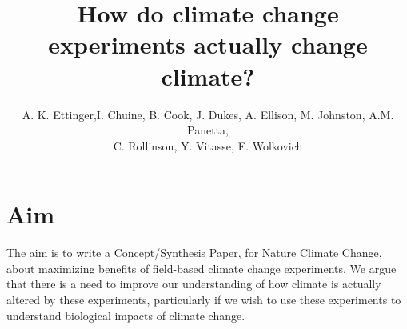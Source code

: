 \documentclass{article}
\begin{document}
 
\title{How do climate change experiments actually change climate?} %

\author{A. K. Ettinger,I. Chuine, B. Cook, J. Dukes, A. Ellison, M. Johnston, A.M. Panetta,\\ C. Rollinson, Y. Vitasse, E. Wolkovich}
\maketitle  %

\section {Aim}

The aim is to write a Concept/Synthesis Paper, for Nature Climate Change, about maximizing benefits of field-based climate change experiments. We argue that there is a need to improve our understanding of how climate is actually altered by these experiments, particularly if we wish to use these experiments to understand biological impacts of climate change. %
\end{document}
